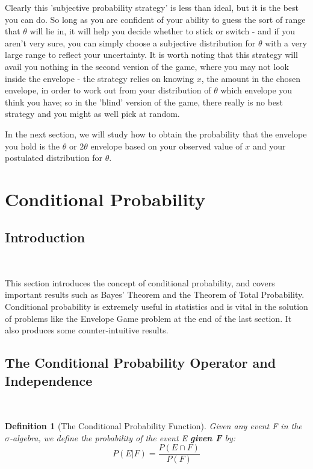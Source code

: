 \documentclass[12pt,a4paper]{article}
\newtheorem{defn}[thm]{Definition}
\begin{document}
Clearly this 'subjective probability strategy' is less than ideal, but it is the best you can do. So long as you are confident of your ability to guess the sort of range that $\theta$ will lie in, it will help you decide whether to stick or switch - and if you aren't very sure, you can simply choose a subjective distribution for $\theta$ with a very large range to reflect your uncertainty. It is worth noting that this strategy will avail you nothing in the second version of the game, where you may not look inside the envelope - the strategy relies on knowing $x$, the amount in the chosen envelope, in order to work out from your distribution of $\theta$ which envelope you think you have; so in the 'blind' version of the game, there really is no best strategy and you might as well pick at random.

In the next section, we will study how to obtain the probability that the envelope you hold is the $\theta$ or $2\theta$ envelope based on your observed value of $x$ and your postulated distribution for $\theta$.

\clearpage
\section{Conditional Probability}

\subsection{Introduction}$\;$

This section introduces the concept of conditional probability, and covers important results such as Bayes' Theorem and the Theorem of Total Probability. Conditional probability is extremely useful in statistics and is vital in the solution of problems like the Envelope Game problem at the end of the last section. It also produces some counter-intuitive results.

\subsection{The Conditional Probability Operator and Independence}\label{conditional and independence}$\;$
\begin{defn}[The Conditional Probability Function]

Given any event F in the $\sigma$-algebra, we define the probability of the event E \textbf{given F} by:
$$P(E|F) = \frac{P(E \cap F)}{P(F)}$$
\end{defn}
\end{document}
